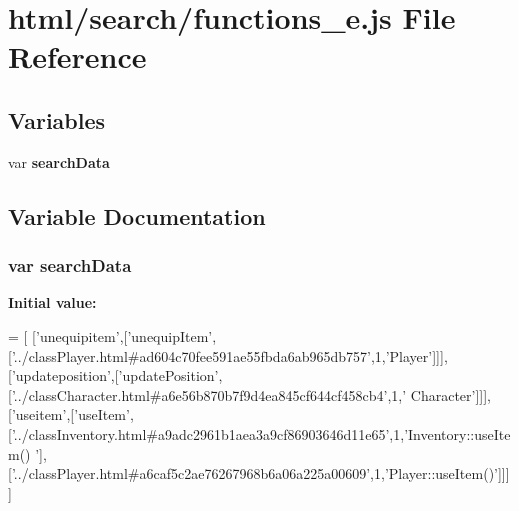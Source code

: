 \section{html/search/functions\-\_\-e.js File Reference}
\label{functions__e_8js}
\subsection*{Variables}
\begin{DoxyCompactItemize}
\item 
var {\bf search\-Data}
\end{DoxyCompactItemize}


\subsection{Variable Documentation}
\subsubsection[{search\-Data}]{\setlength{\rightskip}{0pt plus 5cm}var search\-Data}\label{functions__e_8js_ad01a7523f103d6242ef9b0451861231e}
{\bfseries Initial value\-:}
\begin{DoxyCode}
=
[
  [\textcolor{stringliteral}{'unequipitem'},[\textcolor{stringliteral}{'unequipItem'},[\textcolor{stringliteral}{'../classPlayer.html#ad604c70fee591ae55fbda6ab965db757'},1,\textcolor{stringliteral}{'Player'}]]],
  [\textcolor{stringliteral}{'updateposition'},[\textcolor{stringliteral}{'updatePosition'},[\textcolor{stringliteral}{'../classCharacter.html#a6e56b870b7f9d4ea845cf644cf458cb4'},1,\textcolor{stringliteral}{'
      Character'}]]],
  [\textcolor{stringliteral}{'useitem'},[\textcolor{stringliteral}{'useItem'},[\textcolor{stringliteral}{'../classInventory.html#a9adc2961b1aea3a9cf86903646d11e65'},1,\textcolor{stringliteral}{'Inventory::useItem()
      '}],[\textcolor{stringliteral}{'../classPlayer.html#a6caf5c2ae76267968b6a06a225a00609'},1,\textcolor{stringliteral}{'Player::useItem()'}]]]
]
\end{DoxyCode}
